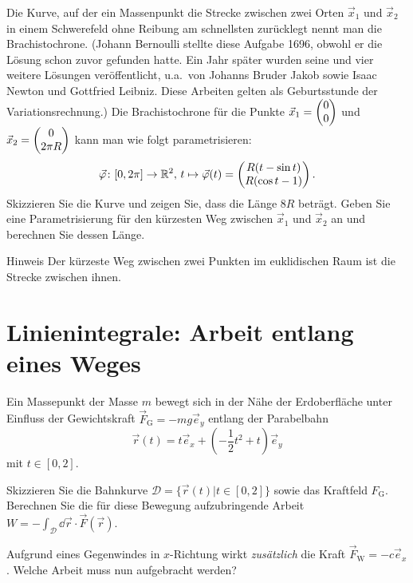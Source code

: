 \documentclass{scrartcl}
\renewcommand{\ee}{\vec{e}}
\begin{document}
Die Kurve, auf der ein Massenpunkt die Strecke zwischen zwei Orten $\vec x_1$ und $\vec x_2$ in einem Schwerefeld ohne Reibung am schnellsten zurücklegt nennt man die Brachistochrone.
(Johann Bernoulli stellte diese Aufgabe 1696, obwohl er die Lösung schon zuvor gefunden hatte. 
Ein Jahr später wurden seine und vier weitere Lösungen veröffentlicht, u.a.\ von Johanns Bruder Jakob sowie Isaac Newton und Gottfried Leibniz. 
Diese Arbeiten gelten als Geburtsstunde der Variationsrechnung.)
Die Brachistochrone für die Punkte $\vec x_1 = \begin{pmatrix}0 \\ 0\end{pmatrix}$ und $\vec x_2 = \begin{pmatrix}0 \\ 2 \pi R\end{pmatrix}$ kann man wie folgt parametrisieren:
\[
  \vec{\varphi}\colon [0, 2\pi] \to \mathbb{R}^2, \, t \mapsto \vec\varphi(t) = \begin{pmatrix}R (t - \sin t) \\ R (\cos t - 1)\end{pmatrix}.
\]
Skizzieren Sie die Kurve und zeigen Sie, dass die Länge $8R$ beträgt. 
Geben Sie eine Parametrisierung für den kürzesten Weg zwischen $\vec x_1$ und $\vec x_2$ an und berechnen Sie dessen Länge.
\begin{remark}{Hinweis}
  Der kürzeste Weg zwischen zwei Punkten im euklidischen Raum ist die Strecke zwischen ihnen.
\end{remark}


\section{Linienintegrale: Arbeit entlang eines Weges}
\label{sec:linienintegrale_arbeit_entlang_eines_weges}

Ein Massepunkt der Masse $m$ bewegt sich in der Nähe der Erdoberfläche unter Einfluss der Gewichtskraft $\vec F_\mathrm{G} = - m g \ee_y$ entlang der Parabelbahn
\[
  \vec r(t) = t \ee_x + \left( -\frac{1}{2} t^2 + t \right) \ee_y
\]
mit $t \in [0,2]$.
\begin{subex}
  \item Skizzieren Sie die Bahnkurve $\mathcal{D} = \{ \vec r(t) | t \in [0,2] \}$ sowie das Kraftfeld $F_\mathrm{G}$.
  Berechnen Sie die für diese Bewegung aufzubringende Arbeit $W = - \int_\mathcal{D} \dd \vec r \cdot \vec F(\vec r)$.
  \item Aufgrund eines Gegenwindes in $x$-Richtung wirkt \emph{zusätzlich} die Kraft $\vec F_\mathrm{W} = - c \ee_x$. Welche Arbeit muss nun aufgebracht werden?
\end{subex}


\end{document}
